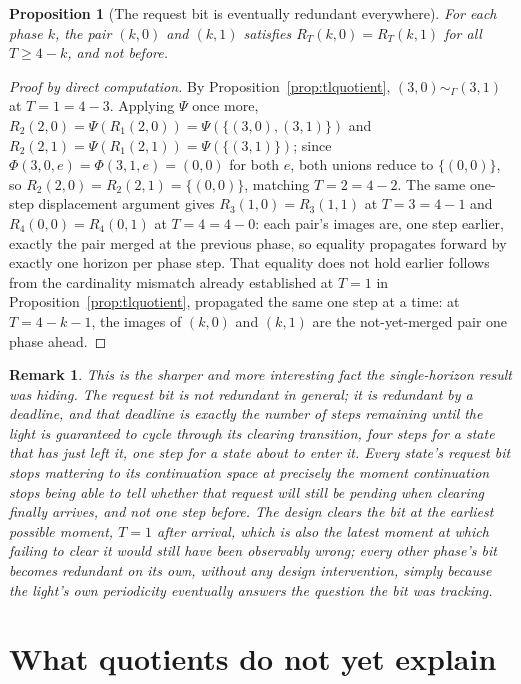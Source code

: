 \documentclass[11pt]{report}
\newtheorem{proposition}{Proposition}[chapter]
\newtheorem{remark}{Remark}[chapter]
\begin{document}
\begin{proposition}[The request bit is eventually redundant everywhere]
\label{prop:eventual}
For each phase $k$, the pair $(k,0)$ and $(k,1)$ satisfies
$R_T(k,0) = R_T(k,1)$ for all $T \geq 4 - k$, and not before.
\end{proposition}
\begin{proof}[Proof by direct computation]
By Proposition~\ref{prop:tlquotient}, $(3,0) \sim_\Gamma (3,1)$ at
$T=1 = 4-3$. Applying $\Psi$ once more,
$R_2(2,0) = \Psi(R_1(2,0)) = \Psi(\{(3,0),(3,1)\})$ and
$R_2(2,1) = \Psi(R_1(2,1)) = \Psi(\{(3,1)\})$; since
$\Phi(3,0,e) = \Phi(3,1,e) = (0,0)$ for both $e$, both unions reduce
to $\{(0,0)\}$, so $R_2(2,0) = R_2(2,1) = \{(0,0)\}$, matching
$T = 2 = 4-2$. The same one-step displacement argument gives
$R_3(1,0) = R_3(1,1)$ at $T=3=4-1$ and $R_4(0,0) = R_4(0,1)$ at
$T=4=4-0$: each pair's images are, one step earlier, exactly the
pair merged at the previous phase, so equality propagates forward by
exactly one horizon per phase step. That equality does not hold
earlier follows from the cardinality mismatch already established at
$T=1$ in Proposition~\ref{prop:tlquotient}, propagated the same one
step at a time: at $T = 4-k-1$, the images of $(k,0)$ and $(k,1)$ are
the not-yet-merged pair one phase ahead.
\end{proof}

\begin{remark}
This is the sharper and more interesting fact the single-horizon
result was hiding. The request bit is not redundant in general; it is
redundant \emph{by a deadline}, and that deadline is exactly the
number of steps remaining until the light is guaranteed to cycle
through its clearing transition, four steps for a state that has just
left it, one step for a state about to enter it. Every state's
request bit stops mattering to its continuation space at precisely
the moment continuation stops being able to tell whether that request
will still be pending when clearing finally arrives, and not one step
before. The design clears the bit at the earliest possible moment,
$T=1$ after arrival, which is also the latest moment at which failing
to clear it would still have been observably wrong; every other
phase's bit becomes redundant on its own, without any design
intervention, simply because the light's own periodicity eventually
answers the question the bit was tracking.
\end{remark}

\section*{What quotients do not yet explain}
\end{document}
